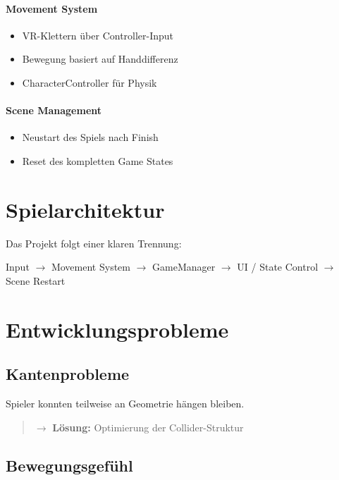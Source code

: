 \documentclass[11pt,a4paper]{article}
\begin{document}
\paragraph{Movement System}
\begin{itemize}
    \item VR-Klettern über Controller-Input
    \item Bewegung basiert auf Handdifferenz
    \item CharacterController für Physik
\end{itemize}

\paragraph{Scene Management}
\begin{itemize}
    \item Neustart des Spiels nach Finish
    \item Reset des kompletten Game States
\end{itemize}

\section{Spielarchitektur}

Das Projekt folgt einer klaren Trennung:

\begin{center}
    \large
    Input $\rightarrow$ Movement System $\rightarrow$ GameManager $\rightarrow$ UI / State Control $\rightarrow$ Scene Restart
\end{center}

\section{Entwicklungsprobleme}

\subsection{Kantenprobleme}

Spieler konnten teilweise an Geometrie hängen bleiben.

\begin{quote}
    $\rightarrow$ \textbf{Lösung:} Optimierung der Collider-Struktur
\end{quote}

\subsection{Bewegungsgefühl}
\end{document}
